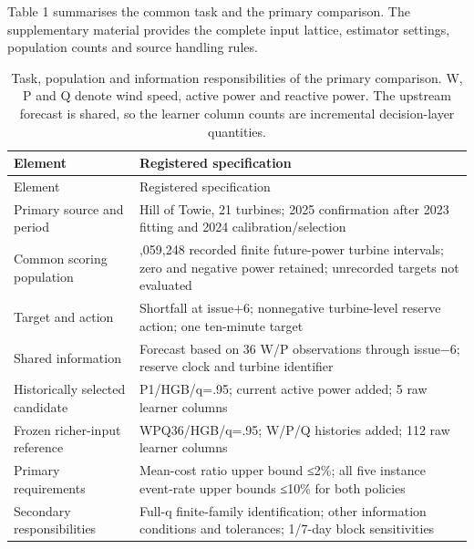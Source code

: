 \documentclass[
  british,
  11pt,
]{article}
\begin{document}
Table 1 summarises the common task and the primary comparison. The
supplementary material provides the complete input lattice, estimator
settings, population counts and source handling rules.

\begin{longtable}[]{@{}
  >{\raggedright\arraybackslash}p{}
  >{\raggedright\arraybackslash}p{}@{}}
\caption{Task, population and information responsibilities of the
primary comparison. W, P and Q denote wind speed, active power and
reactive power. The upstream forecast is shared, so the learner column
counts are incremental decision-layer quantities.}\tabularnewline
\toprule\noalign{}
\begin{minipage}[b]{\linewidth}\raggedright
Element
\end{minipage} & \begin{minipage}[b]{\linewidth}\raggedright
Registered specification
\end{minipage} \\
\midrule\noalign{}
\endfirsthead
\toprule\noalign{}
\begin{minipage}[b]{\linewidth}\raggedright
Element
\end{minipage} & \begin{minipage}[b]{\linewidth}\raggedright
Registered specification
\end{minipage} \\
\midrule\noalign{}
\endhead
\bottomrule\noalign{}
\endlastfoot
Primary source and period & Hill of Towie, 21 turbines; 2025
confirmation after 2023 fitting and 2024 calibration/selection \\
Common scoring population & 1,059,248 recorded finite future-power
turbine intervals; zero and negative power retained; unrecorded targets
not evaluated \\
Target and action & Shortfall at issue+6; nonnegative turbine-level
reserve action; one ten-minute target \\
Shared information & Forecast based on 36 W/P observations through
issue−6; reserve clock and turbine identifier \\
Historically selected candidate & P1/HGB/q=.95; current active power
added; 5 raw learner columns \\
Frozen richer-input reference & WPQ36/HGB/q=.95; W/P/Q histories added;
112 raw learner columns \\
Primary requirements & Mean-cost ratio upper bound ≤2\%; all five
instance event-rate upper bounds ≤10\% for both policies \\
Secondary responsibilities & Full-q finite-family identification; other
information conditions and tolerances; 1/7-day block sensitivities \\
\end{longtable}
\end{document}
